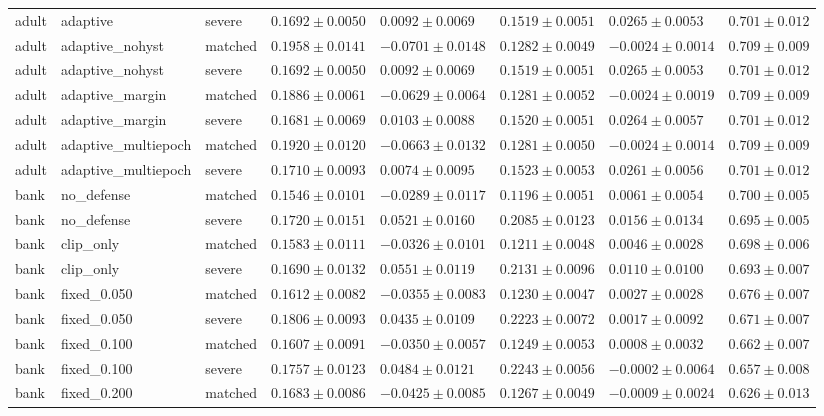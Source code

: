 \begin{table}[!t]
{\begin{tabular}{llllllll}
adult & adaptive & severe & $0.1692\pm0.0050$ & $0.0092\pm0.0069$ & $0.1519\pm0.0051$ & $0.0265\pm0.0053$ & $0.701\pm0.012$ \\
adult & adaptive\_nohyst & matched & $0.1958\pm0.0141$ & $-0.0701\pm0.0148$ & $0.1282\pm0.0049$ & $-0.0024\pm0.0014$ & $0.709\pm0.009$ \\
adult & adaptive\_nohyst & severe & $0.1692\pm0.0050$ & $0.0092\pm0.0069$ & $0.1519\pm0.0051$ & $0.0265\pm0.0053$ & $0.701\pm0.012$ \\
adult & adaptive\_margin & matched & $0.1886\pm0.0061$ & $-0.0629\pm0.0064$ & $0.1281\pm0.0052$ & $-0.0024\pm0.0019$ & $0.709\pm0.009$ \\
adult & adaptive\_margin & severe & $0.1681\pm0.0069$ & $0.0103\pm0.0088$ & $0.1520\pm0.0051$ & $0.0264\pm0.0057$ & $0.701\pm0.012$ \\
adult & adaptive\_multiepoch & matched & $0.1920\pm0.0120$ & $-0.0663\pm0.0132$ & $0.1281\pm0.0050$ & $-0.0024\pm0.0014$ & $0.709\pm0.009$ \\
adult & adaptive\_multiepoch & severe & $0.1710\pm0.0093$ & $0.0074\pm0.0095$ & $0.1523\pm0.0053$ & $0.0261\pm0.0056$ & $0.701\pm0.012$ \\
bank & no\_defense & matched & $0.1546\pm0.0101$ & $-0.0289\pm0.0117$ & $0.1196\pm0.0051$ & $0.0061\pm0.0054$ & $0.700\pm0.005$ \\
bank & no\_defense & severe & $0.1720\pm0.0151$ & $0.0521\pm0.0160$ & $0.2085\pm0.0123$ & $0.0156\pm0.0134$ & $0.695\pm0.005$ \\
bank & clip\_only & matched & $0.1583\pm0.0111$ & $-0.0326\pm0.0101$ & $0.1211\pm0.0048$ & $0.0046\pm0.0028$ & $0.698\pm0.006$ \\
bank & clip\_only & severe & $0.1690\pm0.0132$ & $0.0551\pm0.0119$ & $0.2131\pm0.0096$ & $0.0110\pm0.0100$ & $0.693\pm0.007$ \\
bank & fixed\_0.050 & matched & $0.1612\pm0.0082$ & $-0.0355\pm0.0083$ & $0.1230\pm0.0047$ & $0.0027\pm0.0028$ & $0.676\pm0.007$ \\
bank & fixed\_0.050 & severe & $0.1806\pm0.0093$ & $0.0435\pm0.0109$ & $0.2223\pm0.0072$ & $0.0017\pm0.0092$ & $0.671\pm0.007$ \\
bank & fixed\_0.100 & matched & $0.1607\pm0.0091$ & $-0.0350\pm0.0057$ & $0.1249\pm0.0053$ & $0.0008\pm0.0032$ & $0.662\pm0.007$ \\
bank & fixed\_0.100 & severe & $0.1757\pm0.0123$ & $0.0484\pm0.0121$ & $0.2243\pm0.0056$ & $-0.0002\pm0.0064$ & $0.657\pm0.008$ \\
bank & fixed\_0.200 & matched & $0.1683\pm0.0086$ & $-0.0425\pm0.0085$ & $0.1267\pm0.0049$ & $-0.0009\pm0.0024$ & $0.626\pm0.013$ \\

\end{tabular}}
\end{table}
